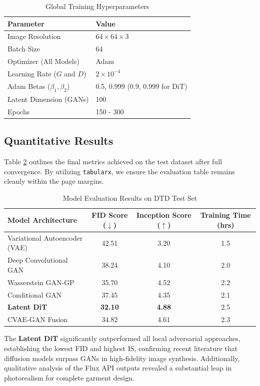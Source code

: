 \documentclass[12pt,a4paper]{article}
\begin{document}
\begin{table}[H]
\centering
\caption{Global Training Hyperparameters}
\label{tab:hyper}
\begin{tabularx}{0.8\textwidth}{X l}
\toprule
\textbf{Parameter} & \textbf{Value} \\
\midrule
Image Resolution & $64 \times 64 \times 3$ \\
Batch Size & 64 \\
Optimizer (All Models) & Adam \\
Learning Rate ($G$ and $D$) & $2 \times 10^{-4}$ \\
Adam Betas ($\beta_1, \beta_2$) & 0.5, 0.999 (0.9, 0.999 for DiT) \\
Latent Dimension (GANs) & 100 \\
Epochs & 150 - 300 \\
\bottomrule
\end{tabularx}
\end{table}

\subsection{Quantitative Results}
Table \ref{tab:results} outlines the final metrics achieved on the test dataset after full convergence. By utilizing \texttt{tabularx}, we ensure the evaluation table remains cleanly within the page margins.

\begin{table}[H]
\centering
\caption{Model Evaluation Results on DTD Test Set}
\label{tab:results}
\begin{tabularx}{\textwidth}{X c c c}
\toprule
\textbf{Model Architecture} & \textbf{FID Score} ($\downarrow$) & \textbf{Inception Score} ($\uparrow$) & \textbf{Training Time (hrs)} \\
\midrule
Variational Autoencoder (VAE) & 42.51 & 3.20 & 1.5 \\
Deep Convolutional GAN & 38.24 & 4.10 & 2.0 \\
Wasserstein GAN-GP & 35.70 & 4.52 & 2.2 \\
Conditional GAN & 37.45 & 4.35 & 2.1 \\
\textbf{Latent DiT} & \textbf{32.10} & \textbf{4.88} & 2.5 \\
CVAE-GAN Fusion & 34.82 & 4.61 & 2.3 \\
\bottomrule
\end{tabularx}
\end{table}

The \textbf{Latent DiT} significantly outperformed all local adversarial approaches, establishing the lowest FID and highest IS, confirming recent literature that diffusion models surpass GANs in high-fidelity image synthesis. Additionally, qualitative analysis of the Flux API outputs revealed a substantial leap in photorealism for complete garment design.
\end{document}
